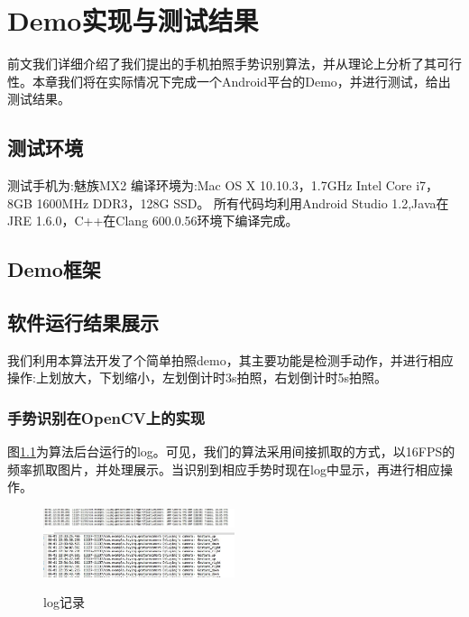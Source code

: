 \documentclass{XDBAthesis}
\begin{document}
\else
\fi
\chapter{Demo实现与测试结果}
前文我们详细介绍了我们提出的手机拍照手势识别算法，并从理论上分析了其可行性。本章我们将在实际情况下完成一个Android平台的Demo，并进行测试，给出测试结果。
\section{测试环境}
测试手机为:魅族MX2
编译环境为:Mac OS X 10.10.3，1.7GHz Intel Core i7，8GB 1600MHz DDR3，128G SSD。
所有代码均利用Android Studio 1.2,Java在JRE 1.6.0，C++在Clang 600.0.56环境下编译完成。
\section{Demo框架}

\section{软件运行结果展示}
我们利用本算法开发了个简单拍照demo，其主要功能是检测手动作，并进行相应操作:上划放大，下划缩小，左划倒计时3s拍照，右划倒计时5s拍照。
\subsection{手势识别在OpenCV上的实现}
图\ref{fg:1}为算法后台运行的log。可见，我们的算法采用间接抓取的方式，以16FPS的频率抓取图片，并处理展示。当识别到相应手势时现在log中显示，再进行相应操作。
\begin{figure}[htb]
    \centering
    \includegraphics[width=0.5\textwidth ]{figure/opencvframe}%
    \includegraphics[width=0.5\textwidth ]{figure/gesture}
    \caption{log记录}
    \label{fg:1}
\end{figure}
\end{document}

